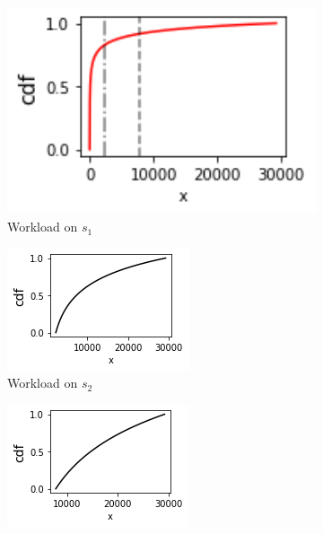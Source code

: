 \begin{figure}
	\centering
	\captionsetup{width=.8\linewidth}
	\begin{subfigure}{.3\textwidth}
		\centering
		\includegraphics[width=1.05\textwidth]{Chapter3/Figures/ws-bp-cdf}
		\caption{Workload on $s_1$}
		\label{fig:wsbp-cdf}
	\end{subfigure}%
	\hfill
	\begin{subfigure}{.3\textwidth}
		\centering
		\includegraphics[width=\textwidth]{Chapter3/Figures/wsbp-highp-cdf}
		\caption{Workload on $s_2$}
		\label{fig:highp-cdf}
	\end{subfigure}
	\hfill
	\begin{subfigure}{.3\textwidth}
		\centering
		\includegraphics[width=\textwidth]{Chapter3/Figures/wsbp-lowp-cdf}

\end{subfigure}
\end{figure}
